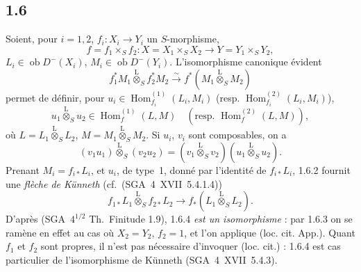 \documentclass[11pt]{article}
\DeclareMathOperator{\Hom}{Hom}
\newcommand{\ob}{\operatorname{ob}}
\providecommand{\Hom}{\operatorname{Hom}}
\providecommand{\ob}{\operatorname{ob}}
\providecommand{\Hom}{\operatorname{Hom}}
\begin{document}
\subsection*{1.6}
Soient, pour $i=1,2$, $f_i:X_i\to Y_i$ un $S$-morphisme,
\[
f=f_1\times_S f_2:X=X_1\times_S X_2\to Y=Y_1\times_S Y_2,
\]
$L_i\in\ob D^{-}(X_i)$, $M_i\in\ob D^{-}(Y_i)$. L'isomorphisme canonique évident
\begin{equation}\tag{1.6.1}
f_1^{*}M_1\overset{\mathrm{L}}{\otimes}_{S}f_2^{*}M_2\xrightarrow{\sim}f^{*}(M_1\overset{\mathrm{L}}{\otimes}_{S}M_2)
\end{equation}
permet de définir, pour $u_i\in\Hom_{f_i}^{(1)}(L_i,M_i)$ (resp. $\Hom_{f_i}^{(2)}(L_i,M_i)$),
\begin{equation}\tag{1.6.2}
u_1\overset{\mathrm{L}}{\otimes}_{S}u_2\in\Hom_{f}^{(1)}(L,M)\quad(\text{resp. }\Hom_f^{(2)}(L,M)),
\end{equation}
où $L=L_1\overset{\mathrm{L}}{\otimes}_{S}L_2$, $M=M_1\overset{\mathrm{L}}{\otimes}_{S}M_2$. Si $u_i$, $v_i$ sont composables, on a
\begin{equation}\tag{1.6.3}
(v_1u_1)\overset{\mathrm{L}}{\otimes}_{S}(v_2u_2)=(v_1\overset{\mathrm{L}}{\otimes}_{S}v_2)(u_1\overset{\mathrm{L}}{\otimes}_{S}u_2).
\end{equation}
Prenant $M_i=f_{i*}L_i$, et $u_i$, de type~1, donné par l'identité de $f_{i*}L_i$, 1.6.2 fournit une \emph{flèche de Künneth} (cf.~(SGA~4~XVII~5.4.1.4))
\begin{equation}\tag{1.6.4}
f_{1*}L_1\overset{\mathrm{L}}{\otimes}_{S}f_{2*}L_2\longrightarrow f_{*}(L_1\overset{\mathrm{L}}{\otimes}_{S}L_2).
\end{equation}
D'après (SGA~$4^{1/2}$ Th.~Finitude 1.9), 1.6.4 \emph{est un isomorphisme} : par 1.6.3 on se ramène en effet au cas où $X_2=Y_2$, $f_2=1$, et l'on applique (loc. cit. App.). Quant $f_1$ et $f_2$ sont propres, il n'est pas nécessaire d'invoquer (loc. cit.) : 1.6.4 est cas particulier de l'isomorphisme de Künneth (SGA~4~XVII~5.4.3).
\end{document}
